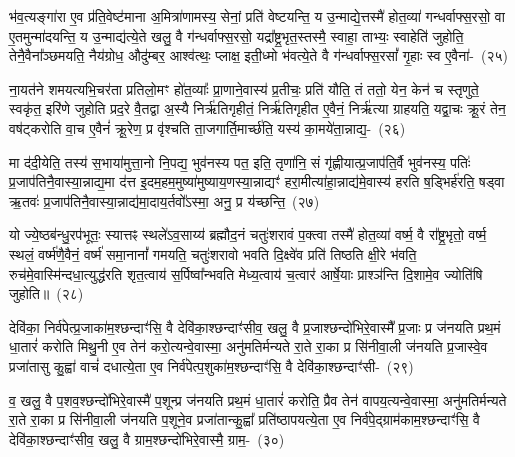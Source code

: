 भ॑व॒त्यङ्गा॑रा ए॒व प्र॑ति॒वेष्ट॑माना अ॒मित्रा॑णामस्य॒ सेनां॒ प्रति॑ वेष्टयन्ति॒ य उ॒न्माद्ये॒त्तस्मै॑ होत॒व्या॑ गन्धर्वाफ्स॒रसो॒ वा ए॒तमुन्मा॑दयन्ति॒ य उ॒न्माद्य॑त्ये॒ते खलु॒ वै ग॑न्धर्वाफ्स॒रसो॒ यद्रा᳚ष्ट्र॒भृत॒स्तस्मै॒ स्वाहा॒ ताभ्यः॒ स्वाहेति॑ जुहोति॒ तेनै॒वैना᳚ञ्छमयति॒ नैय॑ग्रोध॒ औदु॑म्बर॒ आश्व॑त्थः॒ प्लाक्ष॒ इती॒ध्मो भ॑वत्ये॒ते वै ग॑न्धर्वाफ्स॒रसां᳚ गृ॒हाः स्व ए॒वैना॑-~(२५)\ip

ना॒यत॑ने शमयत्यभि॒चर॑ता प्रतिलो॒मꣳ हो॑त॒व्याः᳚ प्रा॒णाने॒वास्य॑ प्र॒तीचः॒ प्रति॑ यौति॒ तं ततो॒ येन॒ केन॑ च स्तृणुते॒ स्वकृ॑त॒ इरि॑णे जुहोति प्रद॒रे वै॒तद्वा अ॒स्यै निर्\mbox{}ऋ॑तिगृहीतं॒ निर्\mbox{}ऋ॑तिगृहीत ए॒वैनं॒ निर्\mbox{}ऋ॑त्या ग्राहयति॒ यद्वा॒चः क्रू॒रं तेन॒ वष॑ट्करोति वा॒च ए॒वैनं॑ क्रू॒रेण॒ प्र वृ॑श्चति ता॒जगार्ति॒मार्च्छ॑ति॒ यस्य॑ का॒मये॑ता॒न्नाद्य॒-~(२६)\ip

मा द॑दी॒येति॒ तस्य॑ स॒भाया॑मुत्ता॒नो नि॒पद्य॒ भुव॑नस्य पत॒ इति॒ तृणा॑नि॒ सं गृ॑ह्णीयात्प्र॒जा\-प॑ति॒र्वै भुव॑नस्य॒ पतिः॑ प्र॒जा\-प॑तिनै॒वास्या॒न्नाद्य॒मा द॑त्त इ॒दम॒हम॒मुष्या॑मुष्याय॒णस्या॒न्नाद्यꣳ॑ हरा॒मीत्या॑हा॒न्नाद्य॑मे॒वास्य॑ हरति ष॒ड्भिर्\mbox{}ह॑रति॒ षड्वा ऋ॒तवः॑ प्र॒जा\-प॑तिनै॒वास्या॒न्नाद्य॑मा॒दाय॒र्तवो᳚\-ऽस्मा॒ अनु॒ प्र य॑च्छन्ति॒~(२७)\ip

यो ज्ये॒ष्ठब॑न्धु॒रप॑भूतः॒ स्यात्तꣴ स्थले॑\-ऽव॒साय्य॑ ब्रह्मौद॒नं चतुः॑शरावं प॒क्त्वा तस्मै॑ होत॒व्या॑ वर्ष्म॒ वै रा᳚ष्ट्र॒भृतो॒ वर्ष्म॒ स्थलं॒ वर्ष्म॑णै॒वैनं॒ वर्ष्म॑ समा॒नानां᳚ गमयति॒ चतुः॑शरावो भवति दि॒क्ष्वे॑व प्रति॑ तिष्ठति क्षी॒रे भ॑वति॒ रुच॑मे॒वास्मि॑\-न्दधा॒त्युद्ध॑रति शृत॒त्वाय॑ स॒र्पिष्वा᳚न्भवति मेध्य॒त्वाय॑ च॒त्वार॑ आर्\mbox{}षे॒याः प्राश्ञ॑न्ति दि॒शामे॒व ज्योति॑षि जुहोति॥~(२८)\ip

{\anuvakamend[{ग्रा॒मी यु॑नक्ती॒ध्मः स्व ए॒वैना॑न॒न्नाद्यं॑ यच्छ॒न्त्येका॒न्नप॑ञ्चा॒शच्च॑}]}

देवि॑का॒ निर्व॑पेत्प्र॒जाका॑म॒श्छन्दाꣳ॑सि॒ वै देवि॑का॒श्छन्दाꣳ॑सीव॒ खलु॒ वै प्र॒जाश्छन्दो॑भि\-रे॒वास्मै᳚ प्र॒जाः प्र ज॑नयति प्रथ॒मं धा॒तारं॑ करोति मिथु॒नी ए॒व तेन॑ करो॒त्यन्वे॒वास्मा॒ अनु॑\-मतिर्मन्यते रा॒ते रा॒का प्र सि॑नीवा॒ली ज॑नयति प्र॒जास्वे॒व प्रजा॑तासु कु॒ह्वा॑ वाचं॑ दधात्ये॒ता ए॒व निर्व॑पेत्प॒शुका॑म॒श्छन्दाꣳ॑सि॒ वै देवि॑का॒श्छन्दाꣳ॑सी-~(२९)\ip

व॒ खलु॒ वै प॒शव॒श्छन्दो॑भिरे॒वास्मै॑ प॒शून्प्र ज॑नयति प्रथ॒मं धा॒तारं॑ करोति॒ प्रैव तेन॑ वापय॒त्यन्वे॒वास्मा॒ अनु॑मतिर्मन्यते रा॒ते रा॒का प्र सि॑नीवा॒ली ज॑नयति प॒शूने॒व प्रजा॑तान्कु॒ह्वा᳚ प्रति॑\-ष्ठापयत्ये॒ता ए॒व निर्व॑पे॒द्ग्राम॑काम॒श्छन्दाꣳ॑सि॒ वै देवि॑का॒श्छन्दाꣳ॑सीव॒ खलु॒ वै ग्राम॒श्छन्दो॑भिरे॒वास्मै॒ ग्राम॒-~(३०)\ip

